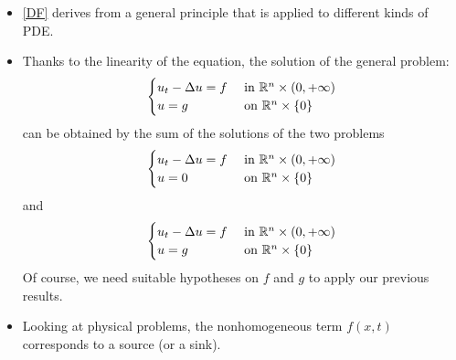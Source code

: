 \begin{remark}
    \begin{itemize}
        \item \ref{DF} derives from a general principle that is applied to different kinds of PDE.
        \item Thanks to the linearity of the equation, the solution of the general problem:
        \begin{equation*}
            \begin{cases}
                u_t - \Delta u = f & \text{ in } \mathbb{R}^n \times (0,+\infty) \\
                u = g & \text{ on } \mathbb{R}^n \times \{0\}
            \end{cases}
        \end{equation*}
        can be obtained by the sum of the solutions of the two problems
        \begin{equation*}
            \begin{cases}
                u_t - \Delta u = f & \text{ in } \mathbb{R}^n \times (0,+\infty) \\
                u = 0 & \text{ on } \mathbb{R}^n \times \{0\}
            \end{cases}
        \end{equation*}
        and 
        \begin{equation*}
            \begin{cases}
                u_t - \Delta u = f & \text{ in } \mathbb{R}^n \times (0,+\infty) \\
                u = g & \text{ on } \mathbb{R}^n \times \{0\}
            \end{cases}
        \end{equation*}
        Of course, we need suitable hypotheses on $f$ and $g$ to apply our previous results. 
        \item Looking at physical problems, the nonhomogeneous term $f(x,t)$ corresponds to a source (or a sink). 
    \end{itemize}
\end{remark}
